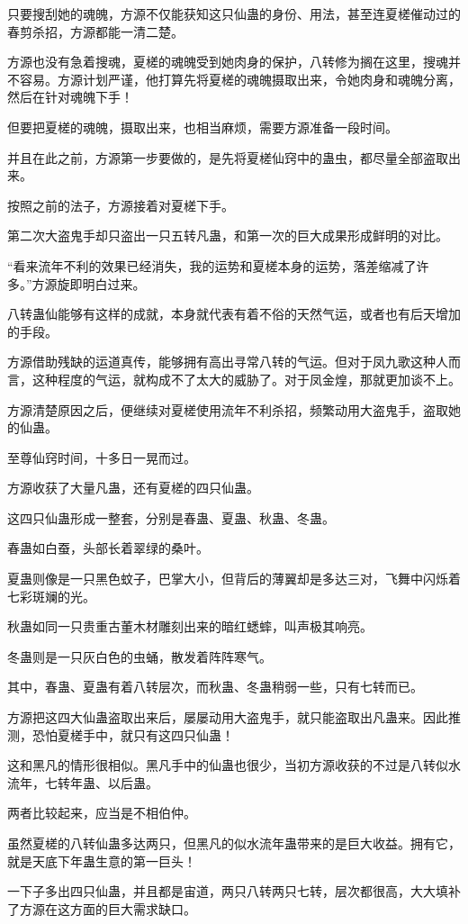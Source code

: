 \begin{this_body}
只要搜刮她的魂魄，方源不仅能获知这只仙蛊的身份、用法，甚至连夏槎催动过的春剪杀招，方源都能一清二楚。

方源也没有急着搜魂，夏槎的魂魄受到她肉身的保护，八转修为搁在这里，搜魂并不容易。方源计划严谨，他打算先将夏槎的魂魄摄取出来，令她肉身和魂魄分离，然后在针对魂魄下手！

但要把夏槎的魂魄，摄取出来，也相当麻烦，需要方源准备一段时间。

并且在此之前，方源第一步要做的，是先将夏槎仙窍中的蛊虫，都尽量全部盗取出来。

按照之前的法子，方源接着对夏槎下手。

第二次大盗鬼手却只盗出一只五转凡蛊，和第一次的巨大成果形成鲜明的对比。

“看来流年不利的效果已经消失，我的运势和夏槎本身的运势，落差缩减了许多。”方源旋即明白过来。

八转蛊仙能够有这样的成就，本身就代表有着不俗的天然气运，或者也有后天增加的手段。

方源借助残缺的运道真传，能够拥有高出寻常八转的气运。但对于凤九歌这种人而言，这种程度的气运，就构成不了太大的威胁了。对于凤金煌，那就更加谈不上。

方源清楚原因之后，便继续对夏槎使用流年不利杀招，频繁动用大盗鬼手，盗取她的仙蛊。

至尊仙窍时间，十多日一晃而过。

方源收获了大量凡蛊，还有夏槎的四只仙蛊。

这四只仙蛊形成一整套，分别是春蛊、夏蛊、秋蛊、冬蛊。

春蛊如白蚕，头部长着翠绿的桑叶。

夏蛊则像是一只黑色蚊子，巴掌大小，但背后的薄翼却是多达三对，飞舞中闪烁着七彩斑斓的光。

秋蛊如同一只贵重古董木材雕刻出来的暗红蟋蟀，叫声极其响亮。

冬蛊则是一只灰白色的虫蛹，散发着阵阵寒气。

其中，春蛊、夏蛊有着八转层次，而秋蛊、冬蛊稍弱一些，只有七转而已。

方源把这四大仙蛊盗取出来后，屡屡动用大盗鬼手，就只能盗取出凡蛊来。因此推测，恐怕夏槎手中，就只有这四只仙蛊！

这和黑凡的情形很相似。黑凡手中的仙蛊也很少，当初方源收获的不过是八转似水流年，七转年蛊、以后蛊。

两者比较起来，应当是不相伯仲。

虽然夏槎的八转仙蛊多达两只，但黑凡的似水流年蛊带来的是巨大收益。拥有它，就是天底下年蛊生意的第一巨头！

一下子多出四只仙蛊，并且都是宙道，两只八转两只七转，层次都很高，大大填补了方源在这方面的巨大需求缺口。


\end{this_body}
